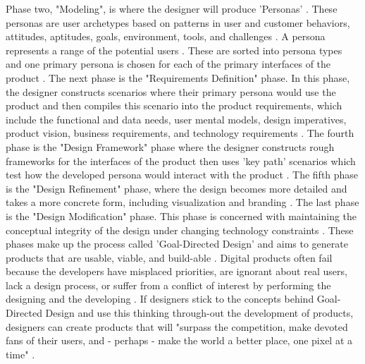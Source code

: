Phase two, "Modeling", is where the designer will produce 'Personas' \cite{aboutface}. These personas are user archetypes based on patterns in user and customer behaviors, attitudes, aptitudes, goals, environment, tools, and challenges \cite{aboutface}. A persona represents a range of the potential users \cite{aboutface}. These are sorted into persona types and one primary persona is chosen for each of the primary interfaces of the product \cite{aboutface}. The next phase is the "Requirements Definition" phase. In this phase, the designer constructs scenarios where their primary persona would use the product and then compiles this scenario into the product requirements, which include the functional and data needs, user mental models, design imperatives, product vision, business requirements, and technology requirements \cite{aboutface}. The fourth phase is the "Design Framework" phase where the designer constructs rough frameworks for the interfaces of the product then uses 'key path' scenarios which test how the developed persona would interact with the product \cite{aboutface}. The fifth phase is the "Design Refinement" phase, where the design becomes more detailed and takes a more concrete form, including visualization and branding \cite{aboutface}. The last phase is the "Design Modification" phase. This phase is concerned with maintaining the conceptual integrity of the design under changing technology constraints \cite{aboutface}. These phases make up the process called 'Goal-Directed Design' and aims to generate products that are usable, viable, and build-able \cite{aboutface}. Digital products often fail because the developers have misplaced priorities, are ignorant about real users, lack a design process, or suffer from a conflict of interest by performing the designing and the developing \cite{aboutface}. If designers stick to the concepts behind Goal-Directed Design and use this thinking through-out the development of products, designers can create products that will "surpass the competition, make devoted fans of their users, and - perhaps - make the world a better place, one pixel at a time" \cite{aboutface}.